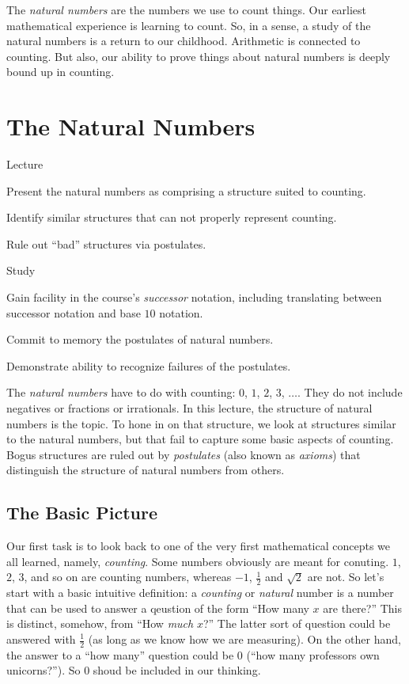 The \emph{natural numbers} are the numbers we use to count things. Our earliest mathematical experience is learning to count. So, in a sense, a study of the natural numbers is a return to our childhood. Arithmetic is connected to counting. But also, our ability to prove things about natural numbers is deeply bound up in counting. 

\chapter{The Natural Numbers}\label{lec:NaturalNumbers}

\begin{goals}
\begin{goal}{Lecture}
\item Present the natural numbers as comprising a structure suited to counting.
\item Identify similar structures that can not properly represent counting.
\item Rule out ``bad'' structures via postulates.
\end{goal}

\begin{goal}{Study}
\item Gain facility in the course's \emph{successor} notation, including
translating between successor notation and base $10$ notation.
\item Commit to memory the postulates of natural numbers.
\item Demonstrate ability to recognize failures of the postulates. 
\end{goal}
\end{goals}

The \emph{natural numbers} have to do with counting: $0$, $1$, $2$, $3$, $\ldots$.
They do not include negatives or fractions or irrationals.
In this lecture, the structure of natural numbers is the topic.
To hone in on that structure, we look at structures similar to the natural numbers, but that fail to capture some basic aspects of counting. 
Bogus structures are ruled out by \emph{postulates} (also known as \emph{axioms}) that distinguish the structure of natural numbers from others.

\section{The Basic Picture}

Our first task is to look back to one of the very first mathematical concepts we all learned, namely, \emph{counting}. Some numbers obviously are meant for conuting. $1$, $2$, $3$, and so on are counting numbers, whereas $-1$, $\frac{1}{2}$ and $\sqrt{2}$  are not. So let's start with a basic intuitive definition: a \emph{counting} or \emph{natural} number is a number that can be used to answer a qeustion of the form ``How many $x$ are there?''
This is distinct, somehow, from ``How \emph{much} $x$?'' The latter sort of question could be answered with $\frac{1}2$ (as long as we know how we are measuring). On the other hand, the answer to a ``how many'' question could be $0$ (``how many professors own unicorns?''). So $0$ shoud be included in our thinking.

